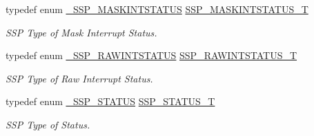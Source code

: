 \begin{DoxyCompactItemize}
typedef enum \hyperlink{group__SSP__17XX__40XX_gafaff4574b830e5b94dcaf7ca8da399e8}{\+\_\+\+S\+S\+P\+\_\+\+M\+A\+S\+K\+I\+N\+T\+S\+T\+A\+T\+US} \hyperlink{group__SSP__17XX__40XX_gac0b1a846ede1f57c5fa27d4163acdbe9}{S\+S\+P\+\_\+\+M\+A\+S\+K\+I\+N\+T\+S\+T\+A\+T\+U\+S\+\_\+T}
\begin{DoxyCompactList}\small\item\em S\+SP Type of Mask Interrupt Status. \end{DoxyCompactList}\item 
typedef enum \hyperlink{group__SSP__17XX__40XX_ga2042535e55396776c81a7235ed95db35}{\+\_\+\+S\+S\+P\+\_\+\+R\+A\+W\+I\+N\+T\+S\+T\+A\+T\+US} \hyperlink{group__SSP__17XX__40XX_gaf901cb9befcf9302650fed7f1ddba443}{S\+S\+P\+\_\+\+R\+A\+W\+I\+N\+T\+S\+T\+A\+T\+U\+S\+\_\+T}
\begin{DoxyCompactList}\small\item\em S\+SP Type of Raw Interrupt Status. \end{DoxyCompactList}\item 
typedef enum \hyperlink{group__SSP__17XX__40XX_ga4ec33a0121a2ccab848c7b37907d9e9d}{\+\_\+\+S\+S\+P\+\_\+\+S\+T\+A\+T\+US} \hyperlink{group__SSP__17XX__40XX_gad95eaf4325a2ec8e457b309d21d6987d}{S\+S\+P\+\_\+\+S\+T\+A\+T\+U\+S\+\_\+T}
\begin{DoxyCompactList}\small\item\em S\+SP Type of Status. \end{DoxyCompactList}\end{DoxyCompactItemize}
